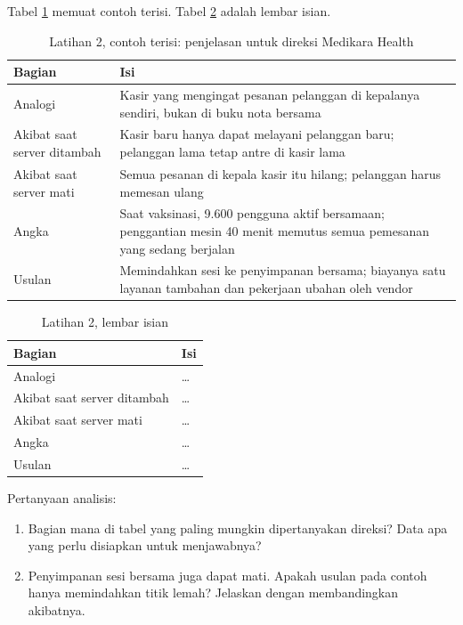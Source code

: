Tabel \ref{tab:ch05-lat2-contoh} memuat contoh terisi. Tabel \ref{tab:ch05-lat2-hasil}
adalah lembar isian.

\begin{table}[!htb]
  \centering
  \footnotesize
  \caption{Latihan 2, contoh terisi: penjelasan untuk direksi Medikara Health}
  \label{tab:ch05-lat2-contoh}
  \begin{tabularx}{\textwidth}{>{\raggedright\arraybackslash}p{2.6cm}
    >{\raggedright\arraybackslash}X}
    \hline
    \textbf{Bagian} & \textbf{Isi} \\
    \hline
    Analogi & Kasir yang mengingat pesanan pelanggan di kepalanya sendiri, bukan di buku
      nota bersama \\
    \hline
    Akibat saat server ditambah & Kasir baru hanya dapat melayani pelanggan baru;
      pelanggan lama tetap antre di kasir lama \\
    \hline
    Akibat saat server mati & Semua pesanan di kepala kasir itu hilang; pelanggan harus
      memesan ulang \\
    \hline
    Angka & Saat vaksinasi, 9.600 pengguna aktif bersamaan; penggantian mesin 40 menit
      memutus semua pemesanan yang sedang berjalan \\
    \hline
    Usulan & Memindahkan sesi ke penyimpanan bersama; biayanya satu layanan tambahan dan
      pekerjaan ubahan oleh vendor \\
    \hline
  \end{tabularx}
\end{table}

\begin{table}[!htb]
  \centering
  \footnotesize
  \caption{Latihan 2, lembar isian}
  \label{tab:ch05-lat2-hasil}
  \begin{tabularx}{\textwidth}{>{\raggedright\arraybackslash}p{2.6cm}
    >{\raggedright\arraybackslash}X}
    \hline
    \textbf{Bagian} & \textbf{Isi} \\
    \hline
    Analogi & \dots \\ \hline
    Akibat saat server ditambah & \dots \\ \hline
    Akibat saat server mati & \dots \\ \hline
    Angka & \dots \\ \hline
    Usulan & \dots \\ \hline
  \end{tabularx}
\end{table}

Pertanyaan analisis:
\begin{enumerate}
  \item Bagian mana di tabel yang paling mungkin dipertanyakan direksi? Data apa yang perlu
        disiapkan untuk menjawabnya?
  \item Penyimpanan sesi bersama juga dapat mati. Apakah usulan pada contoh hanya
        memindahkan titik lemah? Jelaskan dengan membandingkan akibatnya.
\end{enumerate}

